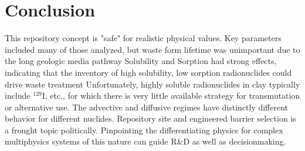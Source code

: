 \section{Conclusion}

This repository concept is "safe" for realistic physical values.  Key parameters 
included many of those analyzed, but waste form lifetime was unimportant due to 
the long geologic media pathway Solubility and Sorption had strong effects, 
indicating that the inventory of high solubility, low sorption radionuclides 
could drive waste treatment Unfortunately, highly soluble radionuclides in clay 
typically include $^{129}$I, etc., for which there is very little available 
strategy for transmutation or alternative use.  The advective and diffusive 
regimes have distinctly different behavior for different nuclides.  Repository 
site and engineered barrier selection is a frought topic politically.  
Pinpointing the differentiating physics for complex multiphysics systems of this 
nature can guide R\&D as well as decisionmaking. 


